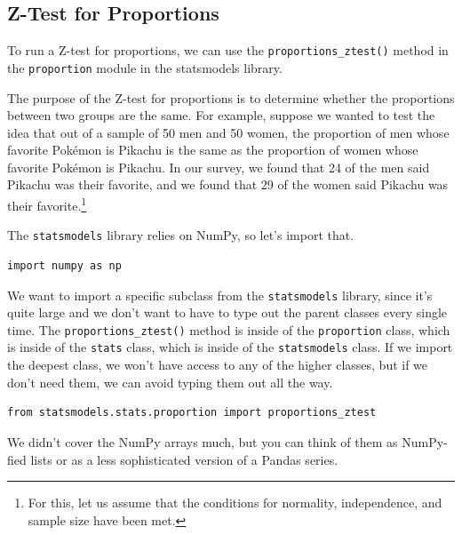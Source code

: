 \subsection{Z-Test for Proportions}
To run a Z-test for proportions, we can use the \verb|proportions_ztest()| method in the \verb|proportion| module in the statsmodels library.\par
The purpose of the Z-test for proportions is to determine whether the proportions between two groups are the same. For example, suppose we wanted to test the idea that out of a sample of 50 men and 50 women, the proportion of men whose favorite Pok\'emon is Pikachu is the same as the proportion of women whose favorite Pok\'emon is Pikachu. In our survey, we found that 24 of the men said Pikachu was their favorite, and we found that 29 of the women said Pikachu was their favorite.\footnote{For this, let us assume that the conditions for normality, independence, and sample size have been met.}\par
The \verb|statsmodels| library relies on NumPy, so let's import that.\par
\begin{lstlisting}[style=pippython]
import numpy as np
\end{lstlisting}
We want to import a specific subclass from the \verb|statsmodels| library, since it's quite large and we don't want to have to type out the parent classes every single time. The \verb|proportions_ztest()| method is inside of the \verb|proportion| class, which is inside of the \verb|stats| class, which is inside of the \verb|statsmodels| class. If we import the deepest class, we won't have access to any of the higher classes, but if we don't need them, we can avoid typing them out all the way.\par
\begin{lstlisting}[style=pippython]
from statsmodels.stats.proportion import proportions_ztest
\end{lstlisting}
We didn't cover the NumPy arrays much, but you can think of them as NumPy-fied lists or as a less sophisticated version of a Pandas series.\par
